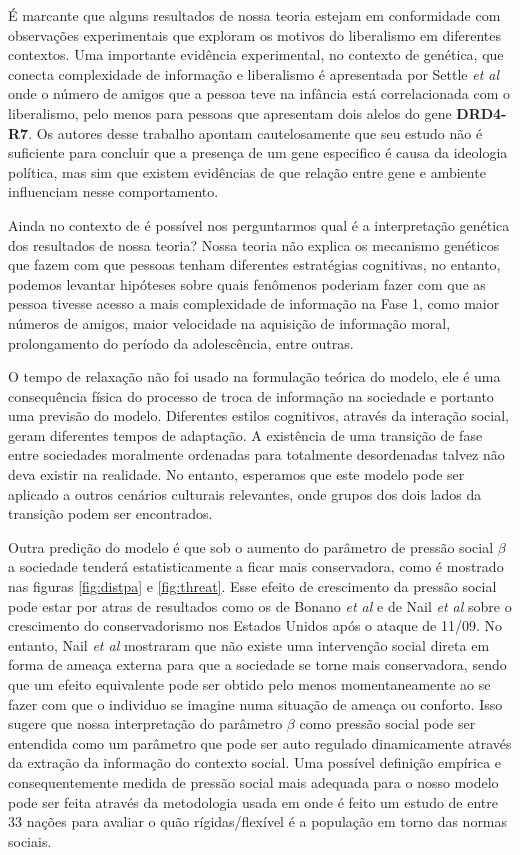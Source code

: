 É marcante que alguns resultados de nossa teoria estejam em conformidade
com observações experimentais que exploram os motivos do liberalismo em
diferentes contextos. Uma importante evidência experimental, no contexto
de genética, que conecta complexidade de informação e liberalismo é
apresentada por Settle \textit{et al} \citep{Settle2010a} onde o número de
amigos que a pessoa teve na infância está correlacionada com o liberalismo,
pelo menos para pessoas que apresentam dois alelos do gene \textbf{DRD4-R7}. Os
autores desse trabalho apontam cautelosamente que seu estudo não é suficiente
para concluir que a presença de um gene especifico é causa da ideologia
política, mas sim que existem evidências de que relação entre gene e
ambiente influenciam nesse comportamento.

Ainda no contexto de \citep{Settle2010a} é possível nos perguntarmos
qual é a interpretação genética dos resultados de nossa teoria? Nossa
teoria não explica os mecanismo genéticos que fazem com que pessoas tenham
diferentes estratégias cognitivas, no entanto, podemos levantar hipóteses
sobre quais fenômenos poderiam fazer com que as pessoa tivesse acesso a
mais complexidade de informação na Fase 1, como maior números de amigos,
maior velocidade na aquisição de informação moral, prolongamento do
período da adolescência, entre outras.

O tempo de relaxação não foi usado na formulação teórica do modelo,
ele é uma consequência física do processo de troca de informação na
sociedade e portanto uma previsão do modelo. Diferentes estilos cognitivos,
através da interação social, geram diferentes tempos de adaptação. A
existência de uma transição de fase entre sociedades moralmente ordenadas
para totalmente desordenadas talvez não deva existir na realidade. No entanto,
esperamos que este modelo pode ser aplicado a outros cenários culturais
relevantes, onde grupos dos dois lados da transição podem ser encontrados.

Outra predição do modelo é que sob o aumento do parâmetro de pressão
social $\beta$ a sociedade tenderá estatisticamente a ficar mais conservadora,
como é mostrado nas figuras \ref{fig:distpa} e \ref{fig:threat}. Esse efeito
de crescimento da pressão social pode estar por atras de resultados como
os de Bonano \textit{et al} \citep{Bonanno2006} e de Nail \textit{et al}
\citep{Nail2009} sobre o crescimento do conservadorismo nos Estados Unidos
após o ataque de 11/09. No entanto, Nail \textit{et al} \citep{Nail2009a}
mostraram que não existe uma intervenção social direta em forma de ameaça
externa para que a sociedade se torne mais conservadora, sendo que um efeito
equivalente pode ser obtido pelo menos momentaneamente ao se fazer com que
o individuo se imagine numa situação de ameaça ou conforto. Isso sugere
que nossa interpretação do parâmetro $\beta$ como pressão social pode
ser entendida como um parâmetro que pode ser auto regulado dinamicamente
através da extração da informação do contexto social.  Uma possível
definição empírica e consequentemente medida de pressão social mais
adequada para o nosso modelo pode ser feita através da metodologia usada em
\citep{Gelfand2011} onde é feito um estudo de entre 33 nações para avaliar
o quão rígidas/flexível é a população em torno das normas sociais.

